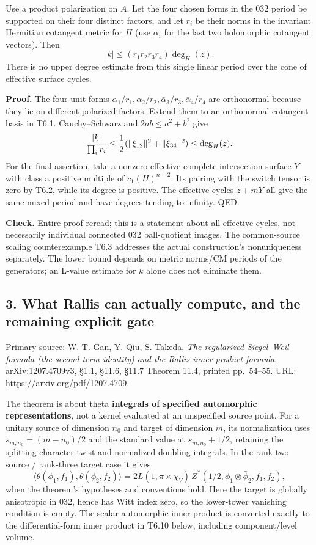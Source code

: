 \documentclass[11pt,a4paper]{article}
\theoremstyle{definition}
\begin{document}
Use a product polarization on \(A\). Let the four chosen forms in the 032 period be supported on their four distinct factors, and let \(r_i\) be their norms in the invariant Hermitian cotangent metric for \(H\) (use \(\bar\alpha_i\) for the last two holomorphic cotangent vectors). Then \[
|k|\le (r_1r_2r_3r_4)\deg_H(z).
\tag{G5}
\] There is no upper degree estimate from this single linear period over the cone of effective surface cycles.

\textbf{Proof.} The four unit forms \(\alpha_1/r_1,\alpha_2/r_2,\bar\alpha_3/r_3,\bar\alpha_4/r_4\) are orthonormal because they lie on different polarized factors. Extend them to an orthonormal cotangent basis in T6.1. Cauchy--Schwarz and \(2ab\le a^2+b^2\) give \[
{|k|\over\prod_i r_i}\le {1\over2}(\|\xi_{12}\|^2+\|\xi_{34}\|^2)
\le\deg_H(z).
\] For the final assertion, take a nonzero effective complete-intersection surface \(Y\) with class a positive multiple of \(c_1(H)^{n-2}\). Its pairing with the switch tensor is zero by T6.2, while its degree is positive. The effective cycles \(z+mY\) all give the same mixed period and have degrees tending to infinity. QED.

\textbf{Check.} Entire proof reread; this is a statement about all effective cycles, not necessarily individual connected 032 ball-quotient images. The common-source scaling counterexample T6.3 addresses the actual construction's nonuniqueness separately. The lower bound depends on metric norms/CM periods of the generators; an L-value estimate for \(k\) alone does not eliminate them.

\subsection{3. What Rallis can actually compute, and the remaining explicit gate}\label{what-rallis-can-actually-compute-and-the-remaining-explicit-gate}

Primary source: W. T. Gan, Y. Qiu, S. Takeda, \emph{The regularized Siegel--Weil formula (the second term identity) and the Rallis inner product formula}, arXiv:1207.4709v3, §1.1, §11.6, §11.7 Theorem 11.4, printed pp.~54--55. URL: \url{https://arxiv.org/pdf/1207.4709}.

The theorem is about theta \textbf{integrals of specified automorphic representations}, not a kernel evaluated at an unspecified source point. For a unitary source of dimension \(n_0\) and target of dimension \(m\), its normalization uses \(s_{m,n_0}=(m-n_0)/2\) and the standard value at \(s_{m,n_0}+1/2\), retaining the splitting-character twist and normalized doubling integrals. In the rank-two source / rank-three target case it gives \[
\langle\theta(\phi_1,f_1),\theta(\phi_2,f_2)\rangle
=2L(1,\pi\times\chi_V)\,Z^*(1/2,\phi_1\otimes\bar\phi_2,f_1,f_2),
\tag{R1}
\] when the theorem's hypotheses and conventions hold. Here the target is globally anisotropic in 032, hence has Witt index zero, so the lower-tower vanishing condition is empty. The scalar automorphic inner product is converted exactly to the differential-form inner product in T6.10 below, including component/level volume.
\end{document}
